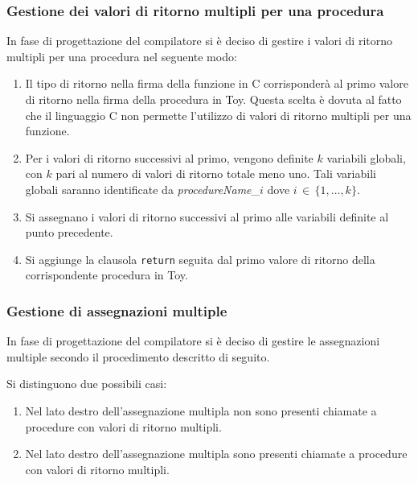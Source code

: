 \documentclass[a4paper,12pt]{article}
\begin{document}
	\subsubsection{Gestione dei valori di ritorno multipli per una procedura}\label{cg:procMultipleRet}
		In fase di progettazione del compilatore si è deciso di gestire i valori di ritorno multipli per una procedura nel seguente modo:
			\begin{enumerate}
				\item Il tipo di ritorno nella firma della funzione in C corrisponderà al primo valore di ritorno nella firma 
				      della procedura in Toy.
                      Questa scelta è dovuta al fatto che il linguaggio C non permette l'utilizzo di valori di ritorno multipli 
                      per una funzione.
				\item Per i valori di ritorno successivi al primo, vengono definite $k$ variabili globali, con $k$ pari
					  al numero di valori di ritorno totale meno uno.
					  Tali variabili globali saranno identificate da \emph{procedureName}\_$i$ dove $i \, \in \, \{1, \dots, k\}$.
				\item Si assegnano i valori di ritorno successivi al primo alle variabili definite al punto precedente.
				\item Si aggiunge la clausola \texttt{return} seguita dal primo valore di ritorno della corrispondente procedura in Toy.
			\end{enumerate}

	\subsubsection{Gestione di assegnazioni multiple}

		In fase di progettazione del compilatore si è deciso di gestire le assegnazioni multiple secondo il procedimento
		descritto di seguito.
		
		Si distinguono due possibili casi:

		\begin{enumerate}
			\item Nel lato destro dell'assegnazione multipla non sono presenti chiamate a procedure con valori di ritorno multipli.
			\item Nel lato destro dell'assegnazione multipla sono presenti chiamate a procedure con valori di ritorno multipli.
		\end{enumerate}
		
\end{document}

